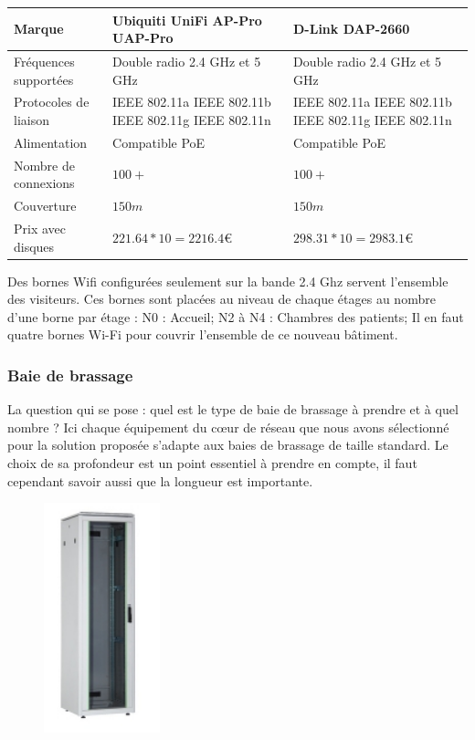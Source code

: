     \begin{center}
        \begin{tabular}{|l|p{5cm}|p{5cm}|}
          \hline
            Marque  & Ubiquiti UniFi AP-Pro UAP-Pro
    &   D-Link DAP-2660
 \\
          \hline
Fréquences supportées
  &
Double radio 2.4 GHz et 5 GHz
    &
Double radio 2.4 GHz et 5 GHz
 \\
          \hline
Protocoles de liaison
  & IEEE 802.11a
IEEE 802.11b
IEEE 802.11g
IEEE 802.11n
    & IEEE 802.11a
IEEE 802.11b
IEEE 802.11g
IEEE 802.11n
 \\
          \hline
            Alimentation  & Compatible PoE & Compatible PoE
                  \\
          \hline
            Nombre de connexions  & $100+$ & $100+$
                  \\
          \hline
            Couverture  & $150m$ & $150m$
                  \\
        \hline
            Prix avec disques &
$221.64 * 10 =2216.4  \euro   $
    &
$298.31 * 10 = 2983.1  \euro   $
 \\
          \hline
        \end{tabular}
    \end{center}

Des bornes Wifi configurées seulement sur la bande 2.4 Ghz servent l'ensemble des visiteurs. Ces bornes sont placées au niveau de chaque étages au nombre d'une borne par étage :
N0 : Accueil;
N2 à N4 : Chambres des patients;
Il en faut quatre bornes Wi-Fi  pour couvrir l'ensemble de ce nouveau bâtiment.



\subsubsection{Baie de brassage}


La question qui se pose : quel est le type de baie de brassage à prendre et à quel nombre ?
Ici chaque équipement du cœur de réseau que nous avons sélectionné pour la solution proposée s'adapte aux baies de brassage de taille standard.
Le choix de sa profondeur est un point essentiel à prendre en compte, il faut cependant savoir aussi que la longueur est importante.

\begin{figure}[!ht]
    \center
    \includegraphics[width=0.3\textwidth]{./images/24.png}
\end{figure}

